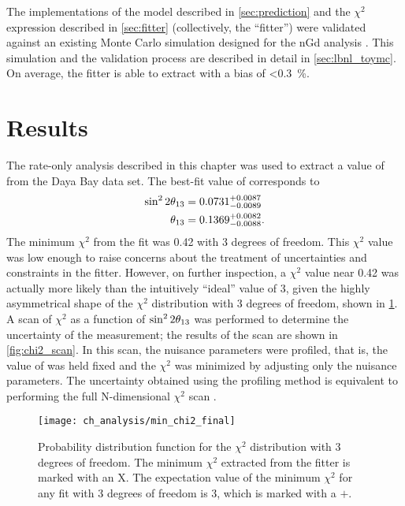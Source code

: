 The implementations of the model described in \cref{sec:prediction}
and the $\chi^2$ expression described in \cref{sec:fitter}
(collectively, the ``fitter'')
were validated against an existing Monte Carlo simulation
designed for the nGd analysis \cite{lbnl_toymc}.
This simulation and the validation process are  described in detail in \cref{sec:lbnl_toymc}.
On average, the fitter is able to extract \thetaot{}
with a bias of \SI{<0.3}{\percent}.

\section{Results}
\label{sec:results}

The rate-only analysis described in this chapter
was used to extract a value of \thetaot{}
from the Daya Bay data set.
The best-fit value of \thetaot{} corresponds to
\begin{align}\label{eq:result}
    \begin{split}
        \sin^22\theta_{13} &= 0.0731^{+0.0087}_{-0.0089}\\
        \theta_{13} &= 0.1369^{+0.0082}_{-0.0088}.
    \end{split}
\end{align}
The minimum $\chi^2$ from the fit was 0.42 with 3 degrees of freedom.
This $\chi^2$ value was low enough to raise concerns
about the treatment of uncertainties and constraints in the fitter.
However, on further inspection, a $\chi^2$ value near 0.42
was actually more likely than the intuitively ``ideal'' value of 3,
given the highly asymmetrical shape
of the $\chi^2$ distribution with 3 degrees of freedom,
shown in \cref{fig:chi2_pdf}.
A scan of $\chi^2$ as a function of $\sin^22\theta_{13}$
was performed to determine the uncertainty of the measurement;
the results of the scan are shown in \cref{fig:chi2_scan}.
In this scan, the nuisance parameters were profiled,
that is, the value of \thetaot{} was held fixed
and the $\chi^2$ was minimized by adjusting only the nuisance parameters.
The uncertainty obtained using the profiling method
is equivalent to performing the full N-dimensional $\chi^2$ scan \cite{pdg}.

\begin{figure}
    \centering
    \texttt{[image: ch\_analysis/min\_chi2\_final]}
    \caption[Minimum $\chi^2$ comparison]{
        Probability distribution function for the $\chi^2$ distribution
        with 3 degrees of freedom.
        The minimum $\chi^2$ extracted from the fitter
        is marked with an X.
        The expectation value of the minimum $\chi^2$
        for any fit with 3 degrees of freedom is 3,
        which is marked with a $+$.
    }
    \label{fig:chi2_pdf}
\end{figure}


